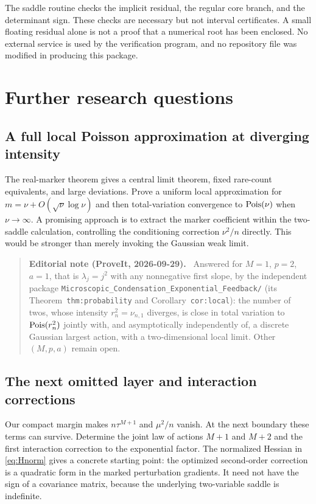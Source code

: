 \documentclass[11pt,a4paper]{article}
\numberwithin{equation}{section}
\theoremstyle{definition}
\theoremstyle{remark}
\newenvironment{ednote}{\par\smallskip\begin{quote}\small\raggedright\textbf{Editorial note (ProveIt, 2026-09-29).}\ }{\end{quote}\smallskip}
\begin{document}
The saddle routine checks the implicit residual, the regular core branch,
and the determinant sign. These checks are necessary but not interval
certificates. A small floating residual alone is not a proof that a numerical
root has been enclosed. No external service is used by the verification
program, and no repository file was modified in producing this package.

\section{Further research questions}
\label{sec:future}
\subsection{A full local Poisson approximation at diverging intensity}
The real-marker theorem gives a central limit theorem, fixed rare-count
equivalents, and large deviations. Prove a uniform local approximation for
$m=\nu+O(\sqrt\nu\log\nu)$ and then total-variation convergence to
$\operatorname{Pois}(\nu)$ when $\nu\to\infty$. A promising approach is to extract the
marker coefficient within the two-saddle calculation, controlling the
conditioning correction $\nu^2/n$ directly. This would be stronger than
merely invoking the Gaussian weak limit.
\begin{ednote}
Answered for $M=1$, $p=2$, $a=1$, that is $\lambda_j=j^2$ with any
nonnegative first slope, by the independent package
\nolinkurl{Microscopic_Condensation_Exponential_Feedback/} (its
Theorem~\texttt{thm:probability} and Corollary~\texttt{cor:local}): the number of twos,
whose intensity $r_n^2=\nu_{n,1}$ diverges, is close in total variation
to $\operatorname{Pois}(r_n^2)$ jointly with, and asymptotically independently of, a
discrete Gaussian largest action, with a two-dimensional local limit.
Other $(M,p,a)$ remain open.
\end{ednote}

\subsection{The next omitted layer and interaction corrections}
Our compact margin makes $n\tau^{M+1}$ and $\mu^2/n$ vanish. At the next
boundary these terms can survive. Determine the joint law of actions
$M+1$ and $M+2$ and the first interaction correction to the exponential
factor. The normalized Hessian in \eqref{eq:Hnorm} gives a concrete starting
point: the optimized second-order correction is a quadratic form in the
marked perturbation gradients. It need not have the sign of a covariance
matrix, because the underlying two-variable saddle is indefinite.
\end{document}
